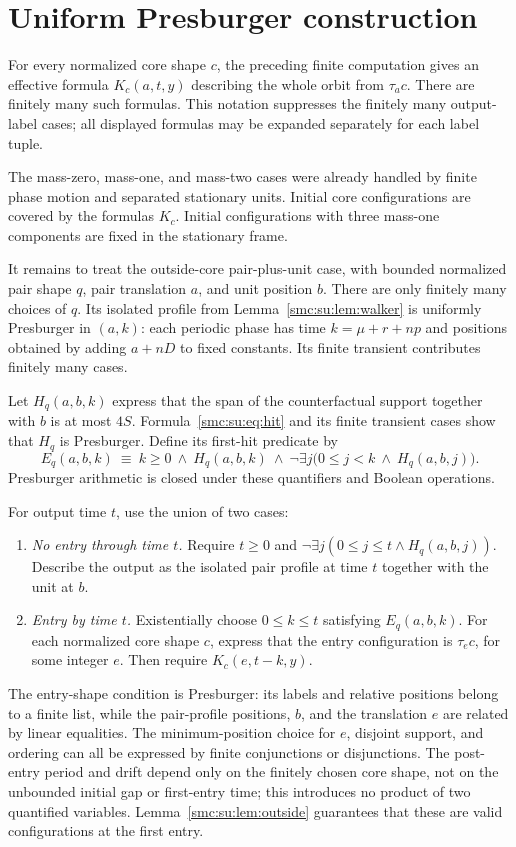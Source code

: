 \documentclass[11pt,letterpaper]{article}
\numberwithin{equation}{section}
\theoremstyle{definition}
\theoremstyle{remark}
\begin{document}
\section{Uniform Presburger construction}\label{smc:su:sec:uniform}

For every normalized core shape $c$, the preceding finite computation gives
an effective formula $K_c(a,t,y)$ describing the whole orbit from $\tau_a c$.
There are finitely many such formulas. This notation suppresses the finitely
many output-label cases; all displayed formulas may be expanded separately for
each label tuple.

The mass-zero, mass-one, and mass-two cases were already handled by finite phase
motion and separated stationary units. Initial core configurations are covered
by the formulas $K_c$. Initial configurations with three mass-one components
are fixed in the stationary frame.

It remains to treat the outside-core pair-plus-unit case, with bounded
normalized pair shape $q$, pair translation $a$, and unit position $b$.
There are only finitely many choices of $q$. Its isolated profile from
Lemma~\ref{smc:su:lem:walker} is uniformly Presburger in $(a,k)$: each periodic phase
has time $k=\mu+r+np$ and positions obtained by adding $a+nD$ to fixed constants.
Its finite transient contributes finitely many cases.

Let $H_q(a,b,k)$ express that the span of the counterfactual support together
with $b$ is at most $4S$. Formula~\eqref{smc:su:eq:hit} and its finite transient cases
show that $H_q$ is Presburger. Define its first-hit predicate by
\[
 E_q(a,b,k)\ \equiv\ k\ge0\ \wedge\ H_q(a,b,k)
 \ \wedge\ \neg\exists j\bigl(0\le j<k\ \wedge\ H_q(a,b,j)\bigr).
\]
Presburger arithmetic is closed under these quantifiers and Boolean operations.

For output time $t$, use the union of two cases:
\begin{enumerate}
\item \emph{No entry through time $t$.} Require $t\ge0$ and
$\neg\exists j(0\le j\le t\wedge H_q(a,b,j))$. Describe the output as the
isolated pair profile at time $t$ together with the unit at $b$.
\item \emph{Entry by time $t$.} Existentially choose $0\le k\le t$ satisfying
$E_q(a,b,k)$. For each normalized core shape $c$, express that the entry
configuration is $\tau_e c$, for some integer $e$. Then require
$K_c(e,t-k,y)$.
\end{enumerate}
The entry-shape condition is Presburger: its labels and relative positions
belong to a finite list, while the pair-profile positions, $b$, and the
translation $e$ are related by linear equalities. The minimum-position choice
for $e$, disjoint support, and ordering can all be expressed by finite
conjunctions or disjunctions. The post-entry period and drift depend only on
the finitely chosen core shape, not on the unbounded initial gap or first-entry
time; this introduces no product of two quantified variables. Lemma~\ref{smc:su:lem:outside} guarantees that these are
valid configurations at the first entry.
\end{document}
